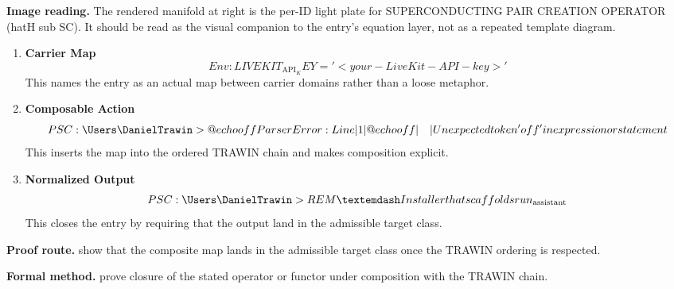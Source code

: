 \begin{samepage}
\noindent\begin{minipage}[t]{0.45\linewidth}
\vspace{0pt}
\raggedright
\scriptsize\textbf{Image reading.} The rendered manifold at right is the per-ID light plate for SUPERCONDUCTING PAIR CREATION OPERATOR (hatH sub SC). It should be read as the visual companion to the entry's equation layer, not as a repeated template diagram.\par
\end{minipage}\hfill
\begin{minipage}[t]{0.53\linewidth}
\vspace*{-0.10in}
\raggedright
{}
\end{minipage}
\end{samepage}

\clearpage


\begin{enumerate}[leftmargin=1.6em,itemsep=9pt,topsep=6pt]
\item \textbf{Carrier Map}
\[
Env:LIVEKIT_{\mathrm{API}}_KEY = '<your-LiveKit-API-key>'
\]
This names the entry as an actual map between carrier domains rather than a loose metaphor.

\item \textbf{Composable Action}
\[
PS C:\Users\DanielTrawin> @echo off ParserError: Line | 1 | @echo off | ~~~ | Unexpected token 'off' in expression or statement
\]
This inserts the map into the ordered TRAWIN chain and makes composition explicit.

\item \textbf{Normalized Output}
\[
PS C:\Users\DanielTrawin> REM — Installer that scaffolds run_{\mathrm{assistant}}
\]
This closes the entry by requiring that the output land in the admissible target class.
\end{enumerate}

\textbf{Proof route.} show that the composite map lands in the admissible target class once the TRAWIN ordering is respected.

\textbf{Formal method.} prove closure of the stated operator or functor under composition with the TRAWIN chain.

\medskip
{}

